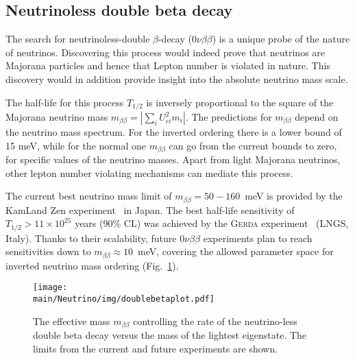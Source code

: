 \subsection{Neutrinoless double beta decay}

The search for neutrinoless-double $\beta$-decay ($0\nu\beta\beta$) is a unique probe of the nature of neutrinos. Discovering this process
would indeed prove that neutrinos are Majorana particles and hence that Lepton number is violated in nature. 
This discovery would in addition provide insight into the absolute neutrino mass scale.

The half-life for this process $T_{1/2}$ is inversely proportional to the square of the Majorana neutrino
mass $m_{\beta \beta}= | \sum_i  U^2_{ei} m_i |$. The predictions for $m_{\beta \beta}$ depend on the neutrino mass spectrum. For the inverted ordering there is a lower bound of 15 meV, while for the normal one $m_{\beta \beta}$ can go from the current bounds to zero, for specific values of the neutrino masses. Apart from light Majorana neutrinos, other lepton number violating mechanisms can mediate this process.


The current best neutrino mass limit of $m_{\beta\beta} = 50 - 160$~meV is provided by the KamLand Zen experiment~\cite{KamLAND-Zen:2016pfg} in Japan. The best half-life sensitivity of $T_{1/2}>11\times 10^{25}$ years (90\% CL) was achieved by the \textsc{Gerda} experiment~\cite{zsigmond} (LNGS, Italy). Thanks to their scalability, future $0\nu\beta\beta$ experiments plan to reach sensitivities down to $m_{\beta\beta} \approx 10$~meV, covering the allowed parameter space for inverted neutrino mass ordering (Fig.~\ref{fig:doublebeta}). 

\begin{figure} [htbp!]
\begin{center}
\texttt{[image: \\main/Neutrino/img/doublebetaplot.pdf]}
\caption{\label{fig:doublebeta} 
The effective mass $ m_{\beta \beta}$ controlling the rate of the neutrino-less double beta decay versus the mass of the lightest eigenstate\cite{pascoli}. The limits from the current and future experiments are shown.}
\end{center}
\end{figure}


